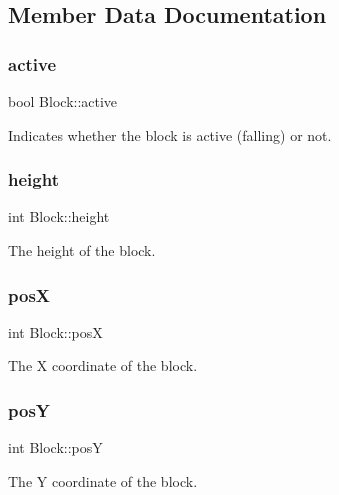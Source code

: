 \subsection{Member Data Documentation}
\mbox{\label{structBlock_a6305c38cf8aaf8df64d97b7bc177b067}} 
\subsubsection{\texorpdfstring{active}{active}}
{\footnotesize\ttfamily bool Block\+::active}



Indicates whether the block is active (falling) or not. 

\mbox{\label{structBlock_a48784377c41dfd4fd323ea238bec42fe}} 
\subsubsection{\texorpdfstring{height}{height}}
{\footnotesize\ttfamily int Block\+::height}



The height of the block. 

\mbox{\label{structBlock_ad1db677097e72dd66e59a29f0bbce569}} 
\subsubsection{\texorpdfstring{posX}{posX}}
{\footnotesize\ttfamily int Block\+::posX}



The X coordinate of the block. 

\mbox{\label{structBlock_a675610bc12401b8d5f494ddae9998916}} 
\subsubsection{\texorpdfstring{posY}{posY}}
{\footnotesize\ttfamily int Block\+::posY}



The Y coordinate of the block. 

